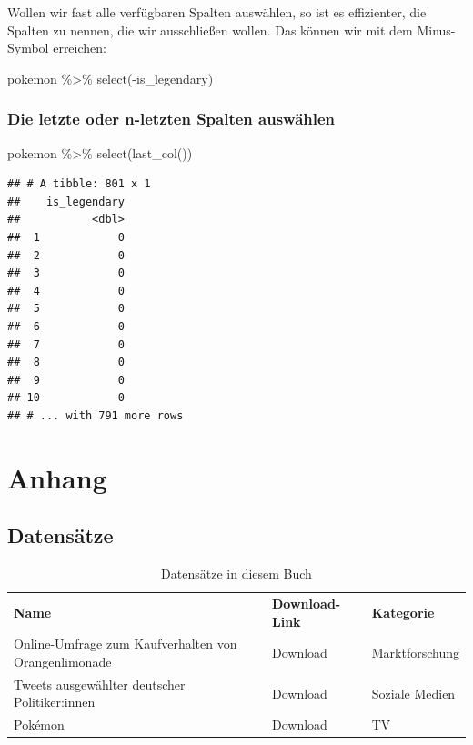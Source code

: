 \documentclass[
]{book}
\newenvironment{Shaded}{\begin{snugshade}}{\end{snugshade}}
\newcommand{\FunctionTok}[1]{\textcolor[rgb]{0.00,0.00,0.00}{#1}}
\newcommand{\NormalTok}[1]{#1}
\newcommand{\SpecialCharTok}[1]{\textcolor[rgb]{0.00,0.00,0.00}{#1}}
\begin{document}
Wollen wir fast alle verfügbaren Spalten auswählen, so ist es effizienter, die Spalten zu nennen, die wir ausschließen wollen. Das können wir mit dem Minus-Symbol erreichen:

\begin{Shaded}
\begin{Highlighting}[]
\NormalTok{pokemon }\SpecialCharTok{\%\textgreater{}\%}
  \FunctionTok{select}\NormalTok{(}\SpecialCharTok{{-}}\NormalTok{is\_legendary)}
\end{Highlighting}
\end{Shaded}

\hypertarget{die-letzte-oder-n-letzten-spalten-auswuxe4hlen}{%
\section{Die letzte oder n-letzten Spalten auswählen}\label{die-letzte-oder-n-letzten-spalten-auswuxe4hlen}}

\begin{Shaded}
\begin{Highlighting}[]
\NormalTok{pokemon }\SpecialCharTok{\%\textgreater{}\%}
  \FunctionTok{select}\NormalTok{(}\FunctionTok{last\_col}\NormalTok{())}
\end{Highlighting}
\end{Shaded}

\begin{verbatim}
## # A tibble: 801 x 1
##    is_legendary
##           <dbl>
##  1            0
##  2            0
##  3            0
##  4            0
##  5            0
##  6            0
##  7            0
##  8            0
##  9            0
## 10            0
## # ... with 791 more rows
\end{verbatim}

\hypertarget{part-anhang}{%
\part*{Anhang}\label{part-anhang}}

\hypertarget{datensaetze}{%
\chapter*{Datensätze}\label{datensaetze}}

\begin{longtable}[]{@{}
  >{\raggedright\arraybackslash}p{}
  >{\raggedright\arraybackslash}p{}
  >{\raggedright\arraybackslash}p{}@{}}
\caption{Datensätze in diesem Buch}\tabularnewline
\toprule
\endhead
\textbf{Name} & \textbf{Download-Link} & \textbf{Kategorie} \\
Online-Umfrage zum Kaufverhalten von Orangenlimonade & \href{datasets/limonade.csv}{Download} & Marktforschung \\
Tweets ausgewählter deutscher Politiker:innen & Download & Soziale Medien \\
Pokémon & Download & TV \\
\bottomrule
\end{longtable}

  
\end{document}
